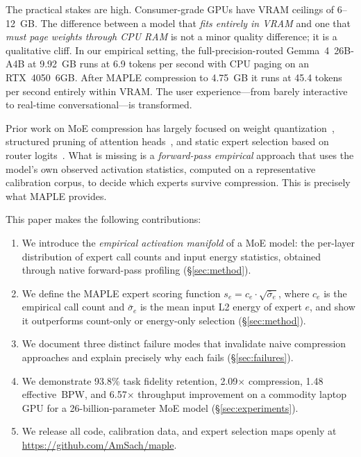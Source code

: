 \documentclass[final]{article}
\newcommand{\MAPLE}{\textsc{MAPLE}}
\begin{document}
The practical stakes are high. Consumer-grade GPUs have VRAM ceilings of 6--12~GB. The difference between a model that \emph{fits entirely in VRAM} and one that \emph{must page weights through CPU RAM} is not a minor quality difference; it is a qualitative cliff. In our empirical setting, the full-precision-routed Gemma~4~26B-A4B at 9.92~GB runs at 6.9 tokens per second with CPU paging on an RTX~4050~6GB. After \MAPLE{} compression to 4.75~GB it runs at 45.4 tokens per second entirely within VRAM. The user experience---from barely interactive to real-time conversational---is transformed.

Prior work on MoE compression has largely focused on weight quantization~\cite{frantar2022gptq,lin2024awq}, structured pruning of attention heads~\cite{michel2019sixteen}, and static expert selection based on router logits~\cite{kim2021bert}. What is missing is a \emph{forward-pass empirical} approach that uses the model's own observed activation statistics, computed on a representative calibration corpus, to decide which experts survive compression. This is precisely what \MAPLE{} provides.

This paper makes the following contributions:
\begin{enumerate}[leftmargin=1.5em,topsep=4pt,itemsep=2pt]
  \item We introduce the \emph{empirical activation manifold} of a MoE model: the per-layer distribution of expert call counts and input energy statistics, obtained through native forward-pass profiling (\S\ref{sec:method}).
  \item We define the \MAPLE{} expert scoring function $s_e = c_e \cdot \sqrt{\bar{\sigma}_e}$, where $c_e$ is the empirical call count and $\bar{\sigma}_e$ is the mean input L2 energy of expert $e$, and show it outperforms count-only or energy-only selection (\S\ref{sec:method}).
  \item We document three distinct failure modes that invalidate naive compression approaches and explain precisely why each fails (\S\ref{sec:failures}).
  \item We demonstrate 93.8\% task fidelity retention, 2.09$\times$ compression, 1.48 effective~BPW, and 6.57$\times$ throughput improvement on a commodity laptop GPU for a 26-billion-parameter MoE model (\S\ref{sec:experiments}).
  \item We release all code, calibration data, and expert selection maps openly at \url{https://github.com/AmSach/maple}.
\end{enumerate}
\end{document}
